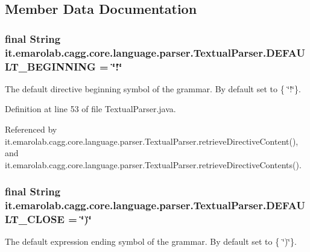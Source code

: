 \subsection{Member Data Documentation}
\hypertarget{classit_1_1emarolab_1_1cagg_1_1core_1_1language_1_1parser_1_1TextualParser_a82e3fa38ac4cf494023ae11e239b18e6}{
\subsubsection[{D\-E\-F\-A\-U\-L\-T\-\_\-\-B\-E\-G\-I\-N\-N\-I\-N\-G}]{\setlength{\rightskip}{0pt plus 5cm}final String it.\-emarolab.\-cagg.\-core.\-language.\-parser.\-Textual\-Parser.\-D\-E\-F\-A\-U\-L\-T\-\_\-\-B\-E\-G\-I\-N\-N\-I\-N\-G = \char`\"{}!\char`\"{}\hspace{0.3cm}{\ttfamily [static]}}}\label{classit_1_1emarolab_1_1cagg_1_1core_1_1language_1_1parser_1_1TextualParser_a82e3fa38ac4cf494023ae11e239b18e6}
The default directive beginning symbol of the grammar. By default set to \{ \char`\"{}!\char`\"{}\}. 

Definition at line 53 of file Textual\-Parser.\-java.



Referenced by it.\-emarolab.\-cagg.\-core.\-language.\-parser.\-Textual\-Parser.\-retrieve\-Directive\-Content(), and it.\-emarolab.\-cagg.\-core.\-language.\-parser.\-Textual\-Parser.\-retrieve\-Directive\-Contents().

\hypertarget{classit_1_1emarolab_1_1cagg_1_1core_1_1language_1_1parser_1_1TextualParser_a477638375efdcb20392b0292871c62df}{
\subsubsection[{D\-E\-F\-A\-U\-L\-T\-\_\-\-C\-L\-O\-S\-E}]{\setlength{\rightskip}{0pt plus 5cm}final String it.\-emarolab.\-cagg.\-core.\-language.\-parser.\-Textual\-Parser.\-D\-E\-F\-A\-U\-L\-T\-\_\-\-C\-L\-O\-S\-E = \char`\"{})\char`\"{}\hspace{0.3cm}{\ttfamily [static]}}}\label{classit_1_1emarolab_1_1cagg_1_1core_1_1language_1_1parser_1_1TextualParser_a477638375efdcb20392b0292871c62df}
The default expression ending symbol of the grammar. By default set to \{ \char`\"{})\char`\"{}\}. 


